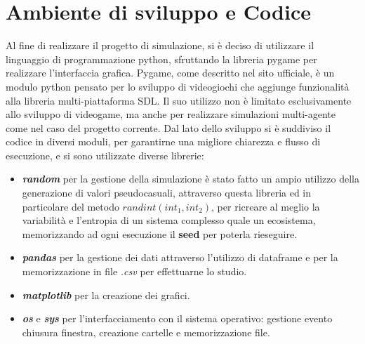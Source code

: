 \documentclass[11pt]{article}
\begin{document}
\section{Ambiente di sviluppo e Codice}
Al fine di realizzare il progetto di simulazione, si è deciso di utilizzare il linguaggio di programmazione python, sfruttando la libreria pygame per realizzare l'interfaccia grafica. Pygame, come descritto nel sito ufficiale\cite{PyGame}, è un modulo python pensato per lo sviluppo di videogiochi che aggiunge funzionalità alla libreria multi-piattaforma SDL. Il suo utilizzo non è limitato esclusivamente allo sviluppo di videogame, ma anche per realizzare simulazioni multi-agente come nel caso del progetto corrente. Dal lato dello sviluppo si è suddiviso il codice in diversi moduli, per garantirne una migliore chiarezza e flusso di esecuzione, e si sono utilizzate diverse librerie:
\begin{itemize}
    \item \textit{\textbf{random}} per la gestione della simulazione è stato fatto un ampio utilizzo della generazione di valori pseudocasuali, attraverso questa libreria ed in particolare del metodo $randint(int_1, int_2)$, per ricreare al meglio la variabilità e l'entropia di un sistema complesso quale un ecosistema, memorizzando ad ogni esecuzione il \textbf{seed} per poterla rieseguire.
    
    \item \textbf{\textit{pandas}} per la gestione dei dati attraverso l'utilizzo di dataframe e per la memorizzazione in file \textit{.csv} per effettuarne lo studio.
    
    \item \textbf{\textit{matplotlib}} per la creazione dei grafici.
    
    \item \textbf{\textit{\textit{os}}} e \textbf{\textit{sys}} per l'interfacciamento con il sistema operativo: gestione evento chiusura finestra, creazione cartelle e memorizzazione file.
    
\end{itemize} 
\end{document}
